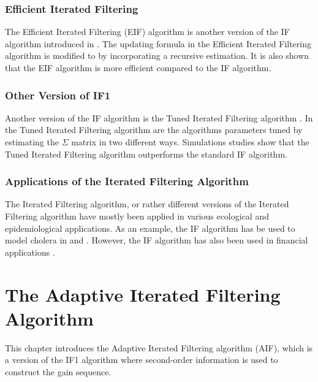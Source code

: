 \documentclass[twoside,openright]{report}
\begin{document}




\subsection{Efficient Iterated Filtering}
The Efficient Iterated Filtering (EIF) algorithm is another version of the IF algorithm introduced in \cite{ionides2012efficient}. The updating formula in the  Efficient Iterated Filtering algorithm is modified to by incorporating a recursive estimation. It is also shown that the EIF algorithm is more efficient compared to the IF algorithm. 


\subsection{Other Version of IF1}

Another version of the IF algorithm is the Tuned Iterated Filtering algorithm \cite{lindstrom2013tuned}. In the Tuned Iterated Filtering algorithm are the algorithms parameters tuned by estimating the $\Sigma$ matrix in two different ways. Simulations studies show that the Tuned Iterated Filtering algorithm outperforms the standard IF algorithm.  


\subsection{Applications of the Iterated Filtering Algorithm}

The Iterated Filtering algorithm, or rather different versions of the Iterated Filtering algorithm have  mostly been applied in various ecological and epidemiological applications. As an example, the IF algorithm has be used to model cholera in \cite{king2008inapparent} and \cite{ionides2015inference}. However,  the IF algorithm has also been used in financial applications   \cite{breto2014idiosyncratic}. 


\chapter{The Adaptive Iterated Filtering Algorithm} \label{chap:AIF}

This chapter introduces the Adaptive Iterated Filtering algorithm (AIF), which is a version of the IF1 algorithm where second-order information is used to construct the gain sequence. 
\end{document}
